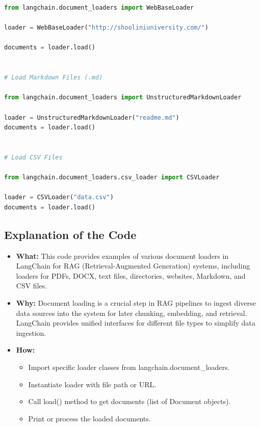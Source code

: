 \documentclass[11pt, a4paper]{article}
\begin{document}
\begin{lstlisting}[language=Python]
from langchain.document_loaders import WebBaseLoader

loader = WebBaseLoader("http://shooliniuniversity.com/")

documents = loader.load()


# Load Markdown Files (.md)

from langchain.document_loaders import UnstructuredMarkdownLoader

loader = UnstructuredMarkdownLoader("readme.md")
documents = loader.load()


# Load CSV Files

from langchain.document_loaders.csv_loader import CSVLoader

loader = CSVLoader("data.csv")
documents = loader.load()
\end{lstlisting}

\subsection{Explanation of the Code}
\begin{itemize}
    \item \textbf{What:} This code provides examples of various document loaders in LangChain for RAG (Retrieval-Augmented Generation) systems, including loaders for PDFs, DOCX, text files, directories, websites, Markdown, and CSV files.
    \item \textbf{Why:} Document loading is a crucial step in RAG pipelines to ingest diverse data sources into the system for later chunking, embedding, and retrieval. LangChain provides unified interfaces for different file types to simplify data ingestion.
    \item \textbf{How:}
    \begin{itemize}
        \item Import specific loader classes from langchain.document\_loaders.
        \item Instantiate loader with file path or URL.
        \item Call load() method to get documents (list of Document objects).
        \item Print or process the loaded documents.
    \end{itemize}
\end{itemize}
\end{document}
